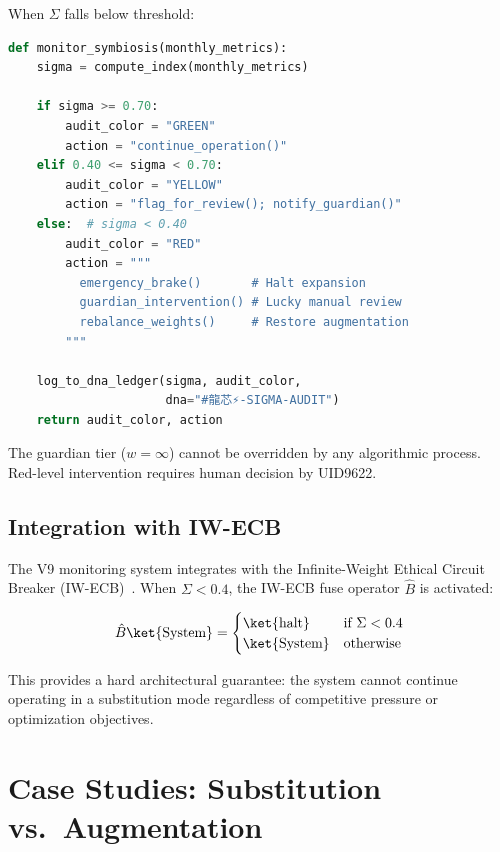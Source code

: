 \documentclass[conference]{IEEEtran}
\begin{document}
When $\Sigma$ falls below threshold:

\begin{lstlisting}[language=Python,
  caption={Symbiosis Index monitoring and intervention}]
def monitor_symbiosis(monthly_metrics):
    sigma = compute_index(monthly_metrics)

    if sigma >= 0.70:
        audit_color = "GREEN"
        action = "continue_operation()"
    elif 0.40 <= sigma < 0.70:
        audit_color = "YELLOW"
        action = "flag_for_review(); notify_guardian()"
    else:  # sigma < 0.40
        audit_color = "RED"
        action = """
          emergency_brake()       # Halt expansion
          guardian_intervention() # Lucky manual review
          rebalance_weights()     # Restore augmentation
        """

    log_to_dna_ledger(sigma, audit_color,
                      dna="#龍芯⚡️-SIGMA-AUDIT")
    return audit_color, action
\end{lstlisting}

The guardian tier ($w=\infty$) cannot be overridden
by any algorithmic process. Red-level intervention
requires human decision by UID9622.

\subsection{Integration with IW-ECB}

The V9 monitoring system integrates with the
Infinite-Weight Ethical Circuit Breaker
(IW-ECB)~\cite{iwecb2026}. When $\Sigma < 0.4$,
the IW-ECB fuse operator $\hat{B}$ is activated:

\begin{equation}
  \hat{B}\ket{\text{System}} =
  \begin{cases}
    \ket{\text{halt}} & \text{if } \Sigma < 0.4 \\
    \ket{\text{System}} & \text{otherwise}
  \end{cases}
  \label{eq:fuse}
\end{equation}

This provides a hard architectural guarantee: the system
cannot continue operating in a substitution mode
regardless of competitive pressure or optimization
objectives.

\section{Case Studies: Substitution vs.\ Augmentation}
\end{document}
